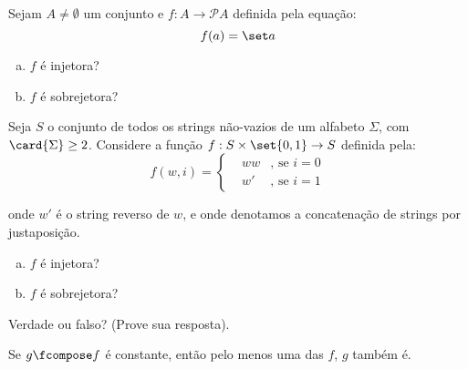 \begin{exercise}
    Sejam $A \not = \emptyset$ um conjunto e $f : A \to \mathcal P A$ definida pela equação:
    $$
        f(a) = \set a
    $$
    \begin {enumerate} [(a)]
        \item $f$ é injetora?
        \item $f$ é sobrejetora?
    \end {enumerate}
\end{exercise}

\begin{exercise}
    Seja $S$ o conjunto de todos os strings não-vazios de um alfabeto $\Sigma$, com $\card{\Sigma} \geq 2$. Considere a função $f : S \times \set{0,1} \to S$ definida pela:
    $$
        f(w, i) = \left \{ \begin{aligned}
                                &ww &\text{, se } i = 0\\
                                &w' &\text{, se } i = 1
                           \end{aligned}
                  \right.
    $$  

    onde $w'$ é o string reverso de $w$, e onde denotamos a concatenação de strings por justaposição.

    \begin{enumerate}[(a)]
        \item $f$ é injetora?
        \item $f$ é sobrejetora?
    \end{enumerate}
\end{exercise}

\begin{exercise}
    Verdade ou falso? (Prove sua resposta).

    Se $g \fcompose f$ é constante, então pelo menos uma das $f$, $g$ também é.
\end{exercise}
